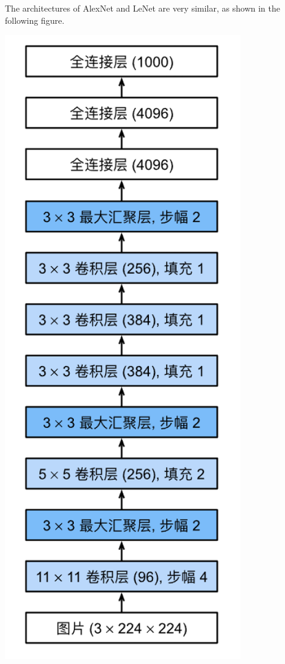 \documentclass[a4paper,12pt]{article}
\begin{document}
The architectures of AlexNet and LeNet are very similar, as shown in the following figure.

\centering %
\includegraphics[scale=0.5]{images/AlexNet.png}
\justifying
\end{document}
